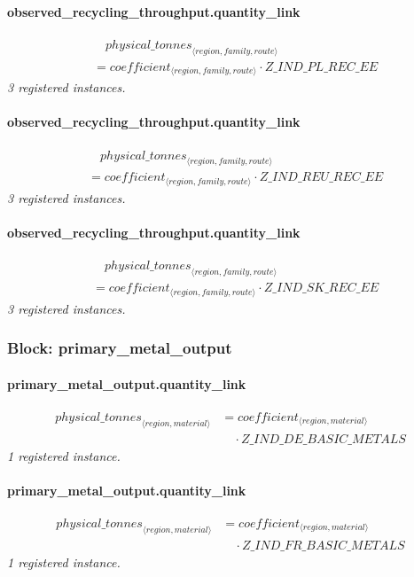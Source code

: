 \documentclass[11pt]{article}
\begin{document}
\paragraph{observed\_recycling\_throughput.quantity\_link}
\begin{align*}
&\quad {physical\_tonnes}_{\langle region, family, route\rangle}\\
&= coefficient_{\langle region, family, route\rangle} \cdot Z\_IND\_PL\_REC\_EE
\end{align*}
\noindent\emph{3 registered instances.}\par
\paragraph{observed\_recycling\_throughput.quantity\_link}
\begin{align*}
&\quad {physical\_tonnes}_{\langle region, family, route\rangle}\\
&= coefficient_{\langle region, family, route\rangle} \cdot Z\_IND\_REU\_REC\_EE
\end{align*}
\noindent\emph{3 registered instances.}\par
\paragraph{observed\_recycling\_throughput.quantity\_link}
\begin{align*}
&\quad {physical\_tonnes}_{\langle region, family, route\rangle}\\
&= coefficient_{\langle region, family, route\rangle} \cdot Z\_IND\_SK\_REC\_EE
\end{align*}
\noindent\emph{3 registered instances.}\par
\subsubsection*{Block: primary\_metal\_output}
\paragraph{primary\_metal\_output.quantity\_link}
\begin{align*}
{physical\_tonnes}_{\langle region, material\rangle} &= coefficient_{\langle region, material\rangle}\\
&\quad {}\cdot Z\_IND\_DE\_BASIC\_METALS
\end{align*}
\noindent\emph{1 registered instance.}\par
\paragraph{primary\_metal\_output.quantity\_link}
\begin{align*}
{physical\_tonnes}_{\langle region, material\rangle} &= coefficient_{\langle region, material\rangle}\\
&\quad {}\cdot Z\_IND\_FR\_BASIC\_METALS
\end{align*}
\noindent\emph{1 registered instance.}\par
\end{document}
